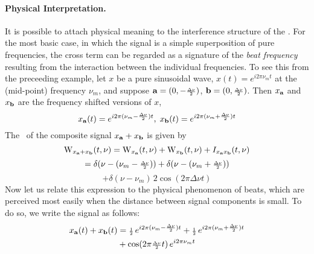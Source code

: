 \paragraph{Physical Interpretation.} 
It is possible to attach physical meaning to the interference structure of the
\WT. For the most basic case, in which the signal is a simple superposition
of pure frequencies, the cross term %
can be regarded as a signature of the \emph{beat frequency} resulting
from the interaction between %
the individual frequencies.  
To see this from the preceeding example, let
$x$ be a pure sinusoidal wave, $x(t) = e^{i2\pi\nu_m t}$ at the (mid-point)
frequency $\nu_m$, and suppose $\mathbf{a} = (0,-{\scriptstyle \frac{\Delta\nu}{2}})$, $\mathbf{b} = (0,{\scriptstyle \frac{\Delta\nu}{2}})$.
Then $x_{\mathbf{a}}$ and $x_{\mathbf{b}}$ are the frequency shifted versions of $x$,
\[%
x_\a(t)%
      =e^{i2\pi(\nu_m-\halfDnu)t},\;
x_\b(t)%
      = e^{i2\pi(\nu_m+\halfDnu)t}
\]%
The \WT\ of the composite signal $x_{\mathbf{a}} + x_{\mathbf{b}}$ is given by
\[  \operatorname{W}_{x_{\mathbf{a}}+x_{\mathbf{b}}}(t,\nu)
    = \operatorname{W}_{x_{\mathbf{a}}}(t,\nu)+\operatorname{W}_{x_{\mathbf{b}}}(t,\nu) + I_{x_{\mathbf{a}} x_{\mathbf{b}}}(t,\nu)\]%
\[ =\delta(\nu-(\nu_m-{\scriptstyle \frac{\Delta\nu}{2}}))+\delta(\nu-(\nu_m+{\scriptstyle \frac{\Delta\nu}{2}}))\]%
\begin{equation}
+ \delta(\nu-\nu_m)\,2\cos(2\pi \Delta\nu t) \label{eq:WignerBeats}
\end{equation}
Now let us relate this expression to the physical phenomenon of
beats, which are perceived most easily when the distance between
signal components %
is small.  To do so, we write the signal as follows:
\begin{align}
x_{\mathbf{a}}(t)+x_{\mathbf{b}}(t) &=
{\scriptstyle \frac{1}{2}} \,e^{i2\pi(\nu_m-{\scriptstyle \frac{\Delta\nu}{2}})t}
      + {\scriptstyle \frac{1}{2}} \,e^{i2\pi(\nu_m+{\scriptstyle \frac{\Delta\nu}{2}})t}\nonumber\\
      &+ \cos(2\pi{\scriptstyle \frac{\Delta\nu}{2}} t)\,e^{i2\pi\nu_m t}\label{eq:sigbeats}
\end{align}
